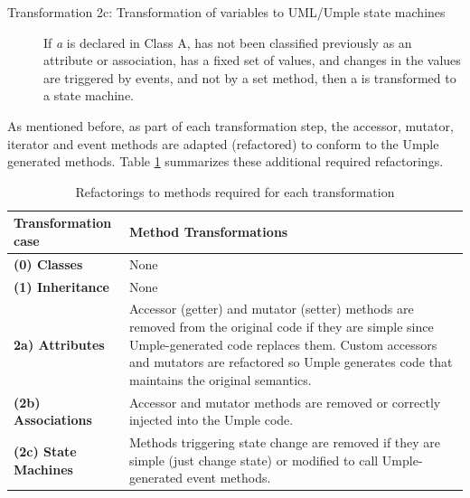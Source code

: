 \begin{description}
\begin{description}
	\item [Transformation 2c: Transformation of variables to UML/Umple state machines]
	If \textit{a} is declared in Class A, has not been classified previously as an attribute or association, has a fixed set of values, and changes in the values are triggered by events, and not by a set method, then a is transformed to a state machine.	

	\end{description}
\end{description}

As mentioned before, as part of each transformation step, the accessor, mutator, iterator and event methods are adapted (refactored) to conform to the Umple generated methods. Table \ref{table:transformations} summarizes these additional required refactorings. 

\begin{table}[htbp]
	\caption{Refactorings to methods required for each transformation}
	\label{table:transformations}
    \centering
    \begin{tabularx}{\textwidth}{| X | X |}
        \toprule
        \rowcolor[HTML]{BBDAFF}
       \textbf{ Transformation case  }   & \textbf{Method Transformations}
        \\ \hline
        \textbf{(0)  Classes }        & None      \\ \hline
        \textbf{(1)  Inheritance}     & None       \\ \hline
        \textbf{2a)  Attributes}      & 
        Accessor (getter) and mutator (setter) methods are removed from the original code if they are simple since 		Umple-generated code replaces them. Custom accessors and mutators are refactored so Umple generates code 			that maintains the original
        semantics.         		\\ \hline
        \textbf{(2b) Associations }   & 
 		Accessor and mutator methods are removed or correctly injected into the Umple code.        
		\\ \hline
        \textbf{(2c) State Machines  }  & 
		Methods triggering state change are removed if they are simple (just change state) or modified to call 				Umple-generated event methods.  	
		\\ \hline
    \end{tabularx}
\end{table}

